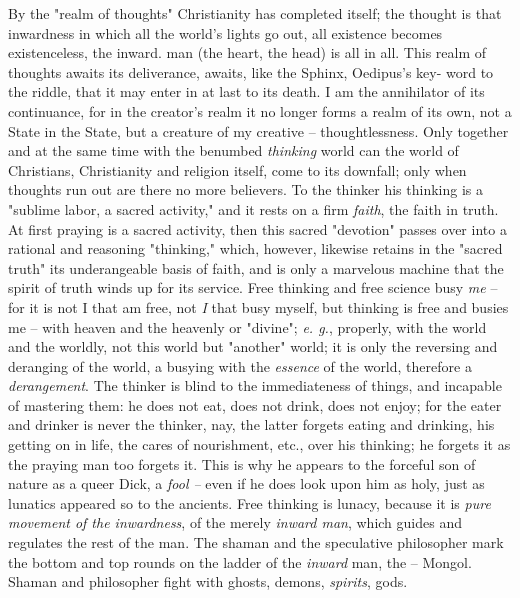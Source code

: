 By the "{}realm of thoughts"{} Christianity has completed itself; the thought 
is that inwardness in which all the world's lights go out, all existence 
becomes existenceless, the inward. man (the heart, the head) is all in all. 
This realm of thoughts awaits its deliverance, awaits, like the Sphinx, 
Oedipus's key- word to the riddle, that it may enter in at last to its death. 
I am the annihilator of its continuance, for in the creator's realm it no 
longer forms a realm of its own, not a State in the State, but a creature of 
my creative -- thoughtlessness. Only together and at the same time with the 
benumbed \textit{thinking} world can the world of Christians, Christianity and 
religion itself, come to its downfall; only when thoughts run out are there no 
more believers. To the thinker his thinking is a "{}sublime labor, a sacred 
activity,"{} and it rests on a firm \textit{faith}, the faith in truth. At 
first praying is a sacred activity, then this sacred "{}devotion"{} passes 
over into a rational and reasoning "{}thinking,"{} which, however, likewise 
retains in the "{}sacred truth"{} its underangeable basis of faith, and is 
only a marvelous machine that the spirit of truth winds up for its service. 
Free thinking and free science busy \textit{me} -- for it is not I that am 
free, not \textit{I} that busy myself, but thinking is free and busies me -- 
with heaven and the heavenly or "{}divine"{}; \textit{e. g.}, properly, with 
the world and the worldly, not this world but "{}another"{} world; it is only 
the reversing and deranging of the world, a busying with the \textit{essence} 
of the world, therefore a \textit{derangement}. The thinker is blind to the 
immediateness of things, and incapable of mastering them: he does not eat, 
does not drink, does not enjoy; for the eater and drinker is never the 
thinker, nay, the latter forgets eating and drinking, his getting on in life, 
the cares of nourishment, etc., over his thinking; he forgets it as the 
praying man too forgets it. This is why he appears to the forceful son of 
nature as a queer Dick, a \textit{fool --} even if he does look upon him as 
holy, just as lunatics appeared so to the ancients. Free thinking is lunacy, 
because it is \textit{pure movement of the inwardness}, of the merely 
\textit{inward man}, which guides and regulates the rest of the man. The 
shaman and the speculative philosopher mark the bottom and top rounds on the 
ladder of the \textit{inward} man, the -- Mongol. Shaman and philosopher fight 
with ghosts, demons, \textit{spirits}, gods.

